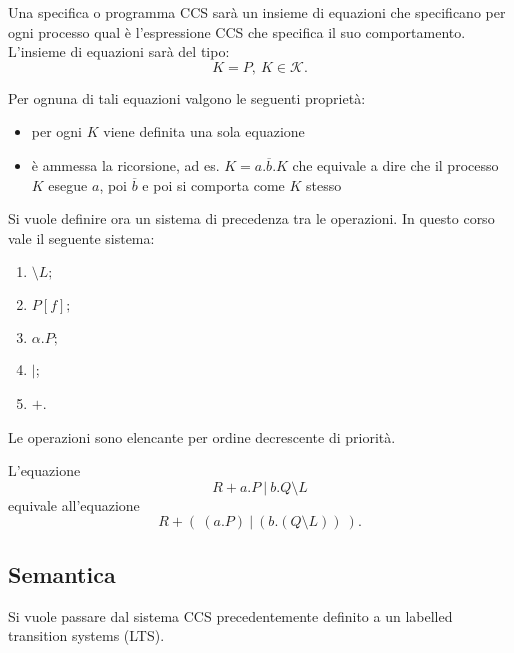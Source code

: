 \begin{deff}
	Una specifica o programma CCS sar\`a un insieme di equazioni che specificano per ogni processo qual \`e l'espressione CCS che specifica il suo comportamento. L'insieme di equazioni sar\`a del tipo: $$K = P,\ K \in \mathcal{K}.$$
\end{deff}
Per ognuna di tali equazioni valgono le seguenti propriet\`a:
\begin{itemize}
	\item per ogni $K$ viene definita una sola equazione
	\item \`e ammessa la ricorsione, ad es. $K = a.\overline{b}.K$ che equivale a dire che il processo $K$ esegue $a$, poi $\overline{b}$ e poi si comporta come $K$ stesso
\end{itemize}

Si vuole definire ora un sistema di precedenza tra le operazioni. In questo corso vale il seguente sistema:
\begin{enumerate}
	\item $\setminus L;$
	\item $P[f];$
	\item $\alpha.P;$
	\item $|$;
	\item $+$.
\end{enumerate}
Le operazioni sono elencante per ordine decrescente di priorit\`a.
\begin{es}
	L'equazione $$ R + a.P\ |\ b.Q \setminus L$$ equivale all'equazione $$ R + (\ (a.P)\ |\ (b.(Q \setminus L))\ ).$$
\end{es}

\subsection{Semantica}
Si vuole passare dal sistema CCS precedentemente definito a un labelled transition systems (LTS). 